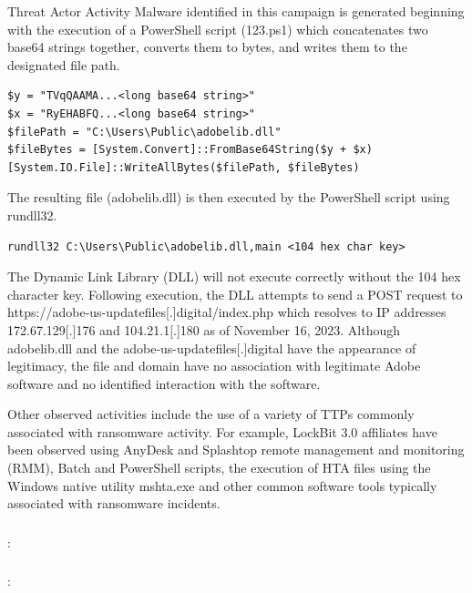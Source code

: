 \documentclass{article}
\begin{document}
Threat Actor Activity
Malware identified in this campaign is generated beginning with the execution of a PowerShell script (123.ps1) which concatenates two base64 strings together, converts them to bytes, and writes them to the designated file path.

\begin{verbatim}
$y = "TVqQAAMA...<long base64 string>"
$x = "RyEHABFQ...<long base64 string>"
$filePath = "C:\Users\Public\adobelib.dll"
$fileBytes = [System.Convert]::FromBase64String($y + $x)
[System.IO.File]::WriteAllBytes($filePath, $fileBytes)
\end{verbatim}

The resulting file (adobelib.dll) is then executed by the PowerShell script using rundll32.

\begin{verbatim}
rundll32 C:\Users\Public\adobelib.dll,main <104 hex char key>
\end{verbatim}

The Dynamic Link Library (DLL) will not execute correctly without the 104 hex character key. Following execution, the DLL attempts to send a POST request to https://adobe-us-updatefiles[.]digital/index.php which resolves to IP addresses 172.67.129[.]176 and 104.21.1[.]180 as of November 16, 2023. Although adobelib.dll and the adobe-us-updatefiles[.]digital have the appearance of legitimacy, the file and domain have no association with legitimate Adobe software and no identified interaction with the software.

Other observed activities include the use of a variety of TTPs commonly associated with ransomware activity. For example, LockBit 3.0 affiliates have been observed using AnyDesk and Splashtop remote management and monitoring (RMM), Batch and PowerShell scripts, the execution of HTA files using the Windows native utility mshta.exe and other common software tools typically associated with ransomware incidents.

\subsubsection{\textcite{CVE-2023-3467}}
\textbf{}: 


\subsubsection{\textcite{CVE-2023-3519}}
\textbf{}: 


\end{document}
